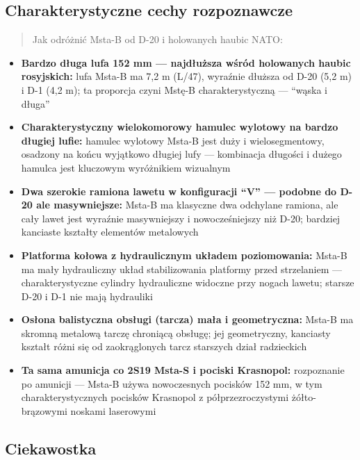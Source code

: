 \documentclass[12pt,oneside]{book}
\providecommand{\tightlist}{%
  \setlength{\itemsep}{0pt}\setlength{\parskip}{0pt}}
\begin{document}
\subsection{Charakterystyczne cechy
rozpoznawcze}\label{charakterystyczne-cechy-rozpoznawcze-31}

\begin{quote}
Jak odróżnić Msta-B od D-20 i holowanych haubic NATO:
\end{quote}

\begin{itemize}
\tightlist
\item
  \textbf{Bardzo długa lufa 152 mm --- najdłuższa wśród holowanych
  haubic rosyjskich:} lufa Msta-B ma 7,2 m (L/47), wyraźnie dłuższa od
  D-20 (5,2 m) i D-1 (4,2 m); ta proporcja czyni Mstę-B
  charakterystyczną --- ``wąska i długa''
\item
  \textbf{Charakterystyczny wielokomorowy hamulec wylotowy na bardzo
  długiej lufie:} hamulec wylotowy Msta-B jest duży i wielosegmentowy,
  osadzony na końcu wyjątkowo długiej lufy --- kombinacja długości i
  dużego hamulca jest kluczowym wyróżnikiem wizualnym
\item
  \textbf{Dwa szerokie ramiona lawetu w konfiguracji ``V'' --- podobne
  do D-20 ale masywniejsze:} Msta-B ma klasyczne dwa odchylane ramiona,
  ale cały lawet jest wyraźnie masywniejszy i nowocześ­niejszy niż D-20;
  bardziej kanciaste kształty elementów metalowych
\item
  \textbf{Platforma kołowa z hydraulicznym układem poziomowania:} Msta-B
  ma mały hydrauliczny układ stabilizowania platformy przed strzelaniem
  --- charakterystyczne cylindry hydrauliczne widoczne przy nogach
  lawetu; starsze D-20 i D-1 nie mają hydrauliki
\item
  \textbf{Osłona balistyczna obsługi (tarcza) mała i geometryczna:}
  Msta-B ma skromną metalową tarczę chroniącą obsługę; jej geometryczny,
  kanciasty kształt różni się od zaokrąglonych tarcz starszych dział
  radzieckich
\item
  \textbf{Ta sama amunicja co 2S19 Msta-S i pociski Krasnopol:}
  rozpoznanie po amunicji --- Msta-B używa nowoczesnych pocisków 152 mm,
  w tym charakterystycznych pocisków Krasnopol z półprzezroczystymi
  żółto-brązowymi noskami laserowymi
\end{itemize}

\subsection{Ciekawostka}\label{ciekawostka-31}
\end{document}

